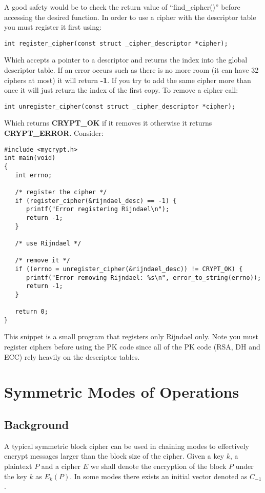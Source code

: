 \documentclass{book}
\begin{document}
A good safety would be to check the return value of ``find\_cipher()'' before accessing the desired function.  In order
to use a cipher with the descriptor table you must register it first using:
\begin{verbatim}
int register_cipher(const struct _cipher_descriptor *cipher);
\end{verbatim}
Which accepts a pointer to a descriptor and returns the index into the global descriptor table.  If an error occurs such
as there is no more room (it can have 32 ciphers at most) it will return {\bf{-1}}.  If you try to add the same cipher more
than once it will just return the index of the first copy.  To remove a cipher call:
\begin{verbatim}
int unregister_cipher(const struct _cipher_descriptor *cipher);
\end{verbatim}
Which returns {\bf CRYPT\_OK} if it removes it otherwise it returns {\bf CRYPT\_ERROR}.  Consider:
\begin{small}
\begin{verbatim}
#include <mycrypt.h>
int main(void)
{
   int errno;
   
   /* register the cipher */
   if (register_cipher(&rijndael_desc) == -1) {
      printf("Error registering Rijndael\n");
      return -1;
   }

   /* use Rijndael */

   /* remove it */
   if ((errno = unregister_cipher(&rijndael_desc)) != CRYPT_OK) {
      printf("Error removing Rijndael: %s\n", error_to_string(errno));
      return -1;
   }

   return 0;
}
\end{verbatim}
\end{small}
This snippet is a small program that registers only Rijndael only.  Note you must register ciphers before
using the PK code since all of the PK code (RSA, DH and ECC) rely heavily on the descriptor tables.

\section{Symmetric Modes of Operations}
\subsection{Background}
A typical symmetric block cipher can be used in chaining modes to effectively encrypt messages larger than the block
size of the cipher.  Given a key $k$, a plaintext $P$ and a cipher $E$ we shall denote the encryption of the block
$P$ under the key $k$ as $E_k(P)$.  In some modes there exists an initial vector denoted as $C_{-1}$.
\end{document}

